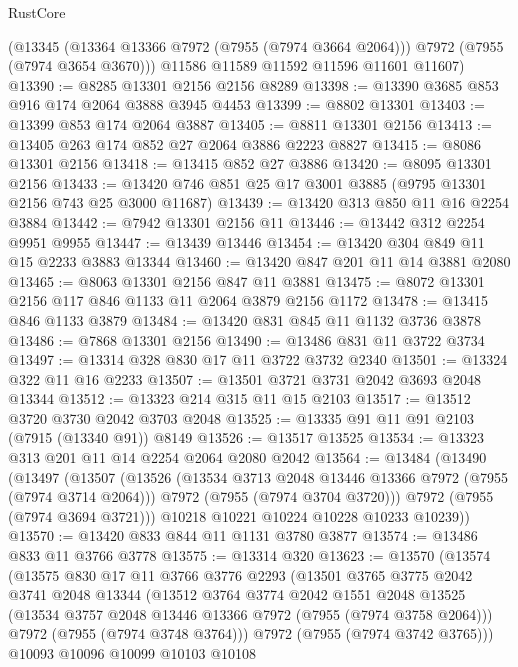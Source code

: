 \begin{lexlean}{RustCore}
\begin{coremodule}
      (@13345 (@13364 @13366 @7972 (@7955 (@7974 @3664 @2064))) @7972 (@7955 (@7974 @3654 @3670)))
      @11586
      @11589
      @11592
      @11596
      @11601
      @11607)
@13390 := @8285 @13301 @2156 @2156 @8289
@13398 := @13390 @3685 @853 @916 @174 @2064 @3888 @3945 @4453
@13399 := @8802 @13301
@13403 := @13399 @853 @174 @2064 @3887
@13405 := @8811 @13301 @2156
@13413 := @13405 @263 @174 @852 @27 @2064 @3886 @2223 @8827
@13415 := @8086 @13301 @2156
@13418 := @13415 @852 @27 @3886
@13420 := @8095 @13301 @2156
@13433 := @13420 @746 @851 @25 @17 @3001 @3885 (@9795 @13301 @2156 @743 @25 @3000 @11687)
@13439 := @13420 @313 @850 @11 @16 @2254 @3884
@13442 := @7942 @13301 @2156 @11
@13446 := @13442 @312 @2254 @9951 @9955
@13447 := @13439 @13446
@13454 := @13420 @304 @849 @11 @15 @2233 @3883 @13344
@13460 := @13420 @847 @201 @11 @14 @3881 @2080
@13465 := @8063 @13301 @2156 @847 @11 @3881
@13475 := @8072 @13301 @2156 @117 @846 @1133 @11 @2064 @3879 @2156 @1172
@13478 := @13415 @846 @1133 @3879
@13484 := @13420 @831 @845 @11 @1132 @3736 @3878
@13486 := @7868 @13301 @2156
@13490 := @13486 @831 @11 @3722 @3734
@13497 := @13314 @328 @830 @17 @11 @3722 @3732 @2340
@13501 := @13324 @322 @11 @16 @2233
@13507 := @13501 @3721 @3731 @2042 @3693 @2048 @13344
@13512 := @13323 @214 @315 @11 @15 @2103
@13517 := @13512 @3720 @3730 @2042 @3703 @2048
@13525 := @13335 @91 @11 @91 @2103 (@7915 (@13340 @91)) @8149
@13526 := @13517 @13525
@13534 := @13323 @313 @201 @11 @14 @2254 @2064 @2080 @2042
@13564 := @13484
    (@13490
      (@13497
        (@13507
          (@13526
            (@13534 @3713 @2048 @13446 @13366 @7972 (@7955 (@7974 @3714 @2064)))
            @7972
            (@7955 (@7974 @3704 @3720)))
          @7972
          (@7955 (@7974 @3694 @3721)))
        @10218
        @10221
        @10224
        @10228
        @10233
        @10239))
@13570 := @13420 @833 @844 @11 @1131 @3780 @3877
@13574 := @13486 @833 @11 @3766 @3778
@13575 := @13314 @320
@13623 := @13570
    (@13574
      (@13575
        @830
        @17
        @11
        @3766
        @3776
        @2293
        (@13501
          @3765
          @3775
          @2042
          @3741
          @2048
          @13344
          (@13512
            @3764
            @3774
            @2042
            @1551
            @2048
            @13525
            (@13534 @3757 @2048 @13446 @13366 @7972 (@7955 (@7974 @3758 @2064)))
            @7972
            (@7955 (@7974 @3748 @3764)))
          @7972
          (@7955 (@7974 @3742 @3765)))
        @10093
        @10096
        @10099
        @10103
        @10108

\end{coremodule}
\end{lexlean}
